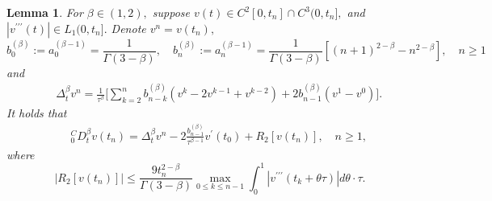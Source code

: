 \documentclass[10pt,a4paper]{amsart}
\newtheorem{lem}{Lemma}
\begin{document}
\begin{lem}\label{dis-lemma-2}
For $\beta \in(1,2), $  suppose  $v(t)\in C^{2}[0,t_n]\cap C^{3}(0,t_n], $ and $|v^{\prime\prime\prime}(t)|\in L_1(0,t_n].$  Denote $v^n=v(t_n),$
\begin{equation}
b_0^{(\beta)}:=a_{0}^{(\beta-1)}=\frac{1}{\Gamma{(3-\beta)}},\quad b_n^{(\beta)}:=a_n^{(\beta-1)}=
\frac{1}{\Gamma{(3-\beta)}}[(n+1)^{2-\beta}-n^{2-\beta}],\quad n\geq 1 \label{coefficients-2}\end{equation}
and
\begin{eqnarray}\label{eq:def-be}
&&\Delta_t^{\beta}v^n=
\frac{1}{\tau^{\beta}}\biggl[  \sum_{k=2}^{n} b_{n-k}^{(\beta)}(v^k-2v^{k-1}+v^{k-2})+ 2b_{n-1}^{(\beta)}(v^1-v^0) \biggl].
\end{eqnarray}  It holds that
\begin{eqnarray} \label{denotion-be}
&& _0^CD_t^{\beta}v(t_n)=\Delta_t^{\beta}v^n- 2  \frac{b_{n-1}^{(\beta)}}{\tau^{\beta-1}}  v^{\prime}(t_0)  +R_2[v(t_n)],\quad n\geq 1,
\end{eqnarray}
where
$$ |R_2[v(t_n)]|\leq \frac{9t_n^{2-\beta}}{\Gamma{(3-\beta)}} \max_{0\leq k\leq n-1}\int_{0}^{1}|v^{\prime\prime\prime}(t_{k}+\theta \tau)|d\theta \cdot \tau.$$
\end{lem}
\end{document}
